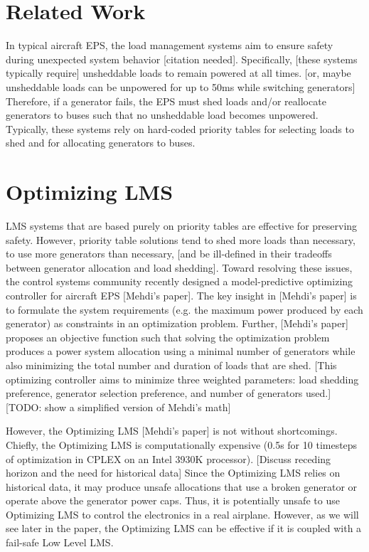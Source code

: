 \documentclass{acm_proc_article-sp}
\begin{document}
\section{Related Work}
\label{sec:related-work}
In typical aircraft EPS, the load management systems aim to ensure safety during unexpected system behavior [citation needed].
Specifically, [these systems typically require] unsheddable loads to remain powered at all times. [or, maybe unsheddable loads can be unpowered for up to 50ms while switching generators]
Therefore, if a generator fails, the EPS must shed loads and/or reallocate generators to buses such that no unsheddable load becomes unpowered.
Typically, these systems rely on hard-coded priority tables for selecting loads to shed and for allocating generators to buses.

\section{Optimizing LMS}
\label{sec:optimizing-LMS}
LMS systems that are based purely on priority tables are effective for preserving safety.
However, priority table solutions tend to shed more loads than necessary, to use more generators than necessary, [and be ill-defined in their tradeoffs between generator allocation and load shedding].
Toward resolving these issues, the control systems community recently designed a model-predictive optimizing controller for aircraft EPS [Mehdi's paper].
The key insight in [Mehdi's paper] is to formulate the system requirements (e.g. the maximum power produced by each generator) as constraints in an optimization problem.
Further, [Mehdi's paper] proposes an objective function such that solving the optimization problem produces a power system allocation using a minimal number of generators while also minimizing the total number and duration of loads that are shed. 
[This optimizing controller aims to minimize three weighted parameters: load shedding preference, generator selection preference, and number of generators used.]
[TODO: show a simplified version of Mehdi's math]

However, the Optimizing LMS [Mehdi's paper] is not without shortcomings.
Chiefly, the Optimizing LMS is computationally expensive (0.5s for 10 timesteps of optimization in CPLEX on an Intel 3930K processor).
[Discuss receding horizon and the need for historical data]
Since the Optimizing LMS relies on historical data, it may produce unsafe allocations that use a broken generator or operate above the generator power caps.
Thus, it is potentially unsafe to use Optimizing LMS to control the electronics in a real airplane. 
However, as we will see later in the paper, the Optimizing LMS can be effective if it is coupled with a fail-safe Low Level LMS.
\end{document}

